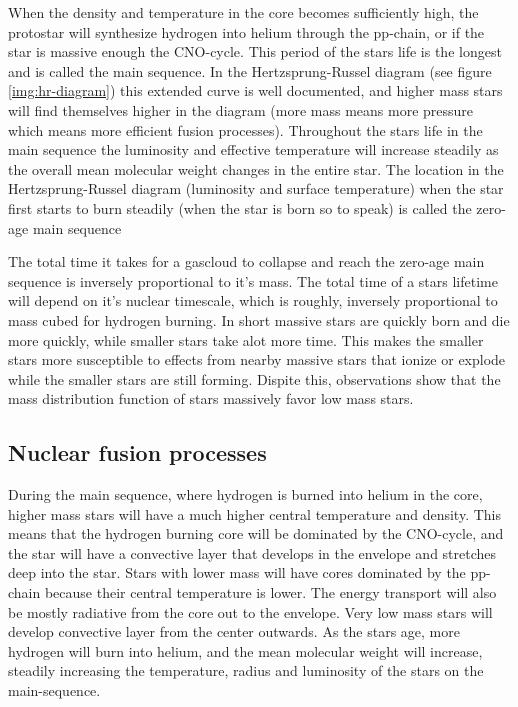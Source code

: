 When the density and temperature in the core becomes sufficiently high, the protostar will synthesize hydrogen into helium through the pp-chain, or if the star is massive enough the CNO-cycle.
This period of the stars life is the longest and is called the main sequence.
In the Hertzsprung-Russel diagram (see figure \ref{img:hr-diagram}) this extended curve is well documented, and higher mass stars will find themselves higher in the diagram (more mass means more pressure which means more efficient fusion processes).
Throughout the stars life in the main sequence the luminosity and effective temperature will increase steadily as the overall mean molecular weight changes in the entire star.
The location in the Hertzsprung-Russel diagram (luminosity and surface temperature) when the star first starts to burn steadily (when the star is born so to speak) is called the zero-age main sequence


The total time it takes for a gascloud to collapse and reach the zero-age main sequence is inversely proportional to it's mass.
The total time of a stars lifetime will depend on it's nuclear timescale, which is roughly, inversely proportional to mass cubed for hydrogen burning.
In short massive stars are quickly born and die more quickly, while smaller stars take alot more time. This makes the smaller stars more susceptible to effects from nearby massive stars that ionize or explode while the smaller stars are still forming.
Dispite this, observations show that the mass distribution function of stars massively favor low mass stars.


\subsection{Nuclear fusion processes}
During the main sequence, where hydrogen is burned into helium in the core, higher mass stars will have a much higher central temperature and density. This means that the hydrogen burning core will be dominated by the CNO-cycle, and the star will have a convective layer that develops in the envelope and stretches deep into the star.
Stars with lower mass will have cores dominated by the pp-chain because their central temperature is lower. The energy transport will also be mostly radiative from the core out to the envelope.
Very low mass stars will develop convective layer from the center outwards.
As the stars age, more hydrogen will burn into helium, and the mean molecular weight will increase, steadily increasing the temperature, radius and luminosity of the stars on the main-sequence.

